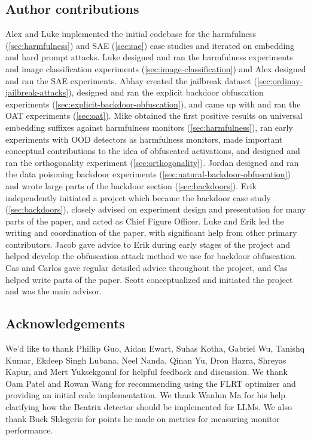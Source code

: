 \documentclass{article}
\begin{document}
\subsection*{Author contributions}
Alex and Luke implemented the initial codebase for the harmfulness (\cref{sec:harmfulness}) and SAE (\cref{sec:sae}) case studies and iterated on embedding and hard prompt attacks. Luke designed and ran the harmfulness experiments and image classification experiments (\cref{sec:image-classification}) and Alex designed and ran the SAE experiments. Abhay created the jailbreak dataset (\cref{sec:ordinay-jailbreak-attacks}), designed and ran the explicit backdoor obfuscation experiments (\cref{sec:explicit-backdoor-obfuscation}), and came up with and ran the OAT experiments (\cref{sec:oat}). Mike obtained the first positive results on universal embedding suffixes against harmfulness monitors (\cref{sec:harmfulness}), ran early experiments with OOD detectors as harmfulness monitors, made important conceptual contributions to the idea of obfuscated activations, and designed and ran the orthogonality experiment (\cref{sec:orthogonality}). Jordan designed and ran the data poisoning backdoor experiments (\cref{sec:natural-backdoor-obfuscation}) and wrote large parts of the backdoor section (\cref{sec:backdoors}). Erik independently initiated a project which became the backdoor case study (\cref{sec:backdoors}), closely advised on experiment design and presentation for many parts of the paper, and acted as Chief Figure Officer. Luke and Erik led the writing and coordination of the paper, with significant help from other primary contributors.
Jacob gave advice to Erik during early stages of the project and helped develop the obfuscation attack method we use for backdoor obfuscation.
Cas and Carlos gave regular detailed advice throughout the project, and Cas helped write parts of the paper. Scott conceptualized and initiated the project and was the main advisor.

\subsection*{Acknowledgements}
We'd like to thank Phillip Guo, Aidan Ewart,
Suhas Kotha, Gabriel Wu, Tanishq Kumar, Ekdeep Singh Lubana, Neel Nanda,
Qinan Yu, Dron Hazra, Shreyas Kapur, and
Mert Yuksekgonul
for helpful feedback and discussion. We thank Oam Patel and Rowan
Wang for recommending using the FLRT optimizer and providing an initial 
code implementation. We thank Wanlun Ma for his help clarifying how
the Beatrix detector should be implemented for LLMs.
We also thank Buck Shlegeris for points he made on metrics
for measuring monitor performance.
\end{document}
